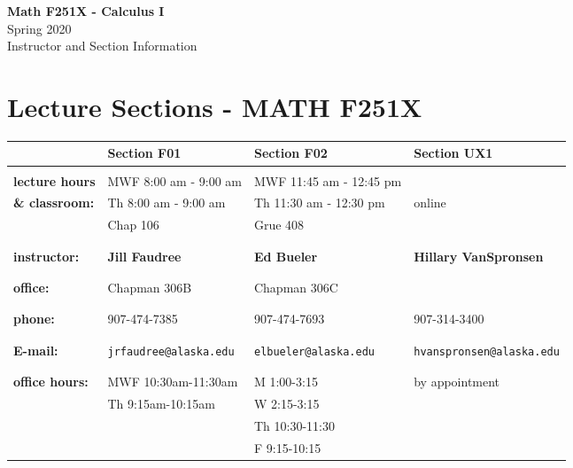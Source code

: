 \documentclass[11pt,fleqn]{article}
\begin{document}
\setcounter{secnumdepth}{0}

\vspace*{-1in}
\begin{center}
\large{\textbf{Math F251X - Calculus I}}\\

\large{Spring 2020\\ Instructor and Section Information}
\end{center}

\vfill

\section{Lecture Sections - MATH F251X}

\begin{tabular}{| l || l | l | l |}
\hline \hline
&Section F01&Section F02&Section UX1\\
\hline \hline
&&&\\
\textbf{lecture hours}&MWF 8:00 am - 9:00 am&MWF 11:45 am - 12:45 pm&\\
\textbf{\& classroom:}&Th 8:00 am - 9:00 am& Th 11:30 am - 12:30 pm & online\\
&Chap 106& Grue 408 & \\
&&&\\
\hline
&&&\\
\textbf{instructor:}&\textbf{Jill Faudree}&\textbf{Ed Bueler}&\textbf{Hillary VanSpronsen}\\
&&&\\
\hline
&&&\\
\textbf{office:}&Chapman 306B&Chapman 306C&\\
&&&\\
\hline
&&&\\
\textbf{phone:}&907-474-7385&907-474-7693&907-314-3400\\ 
&&&\\\hline
&&&\\
\textbf{E-mail:}&\texttt{jrfaudree@alaska.edu} &\texttt{elbueler@alaska.edu} &\texttt{hvanspronsen@alaska.edu}\\ &&&\\ \hline
&&&\\ \textbf{office hours:}&MWF 10:30am-11:30am&M 1:00-3:15&by appointment\\ 
&Th 9:15am-10:15am&W 2:15-3:15&\\ 
&&Th 10:30-11:30&\\
&&F 9:15-10:15&\\
 \hline
\end{tabular}
\end{document}
